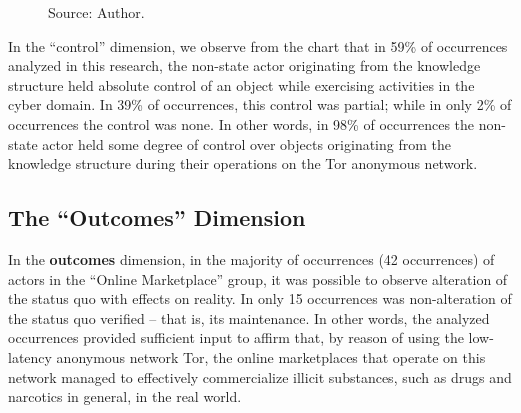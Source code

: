 \begin{figure}[H]
\centering
{}
\caption*{Source: Author.}
\end{figure}

In the ``control'' dimension, we observe from the chart that in 59\% of occurrences analyzed in this research, the non-state actor originating from the knowledge structure held absolute control of an object while exercising activities in the cyber domain. In 39\% of occurrences, this control was partial; while in only 2\% of occurrences the control was none. In other words, in 98\% of occurrences the non-state actor held some degree of control over objects originating from the knowledge structure during their operations on the Tor anonymous network.

\subsection{The ``Outcomes'' Dimension}

In the \textbf{outcomes} dimension, in the majority of occurrences (42 occurrences) of actors in the ``Online Marketplace'' group, it was possible to observe alteration of the status quo with effects on reality. In only 15 occurrences was non-alteration of the status quo verified -- that is, its maintenance. In other words, the analyzed occurrences provided sufficient input to affirm that, by reason of using the low-latency anonymous network Tor, the online marketplaces that operate on this network managed to effectively commercialize illicit substances, such as drugs and narcotics in general, in the real world.

